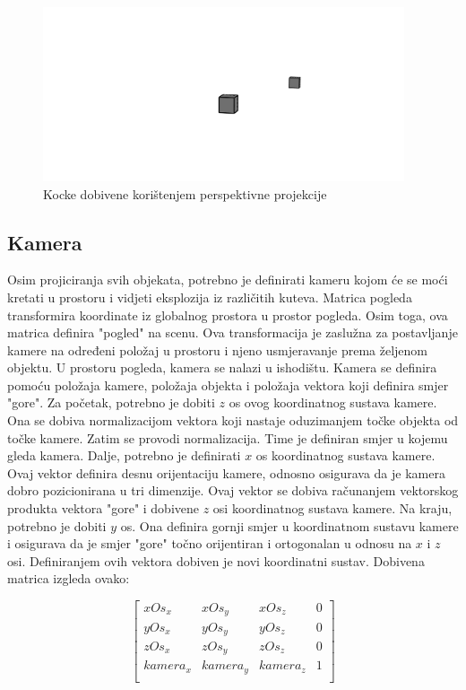 \documentclass{foi}
\begin{document}
\begin{figure}[H]
	\centering
	\includegraphics[width=0.95\textwidth]{slike/37_PerspektivnaProjekcijaKuba.png}
	\captionsetup{justification=centering}
	\caption{Kocke dobivene korištenjem perspektivne projekcije}
	\label{fig:PerspektivnaProjekcijaKuba}
\end{figure}

\subsection{Kamera}
Osim projiciranja svih objekata, potrebno je definirati kameru kojom će se moći kretati u prostoru i vidjeti eksplozija iz različitih kuteva. Matrica pogleda transformira koordinate iz globalnog prostora u prostor pogleda. Osim toga, ova matrica definira "pogled" na scenu. Ova transformacija je zaslužna za postavljanje kamere na određeni položaj u prostoru i njeno usmjeravanje prema željenom objektu. U prostoru pogleda, kamera se nalazi u ishodištu. Kamera se definira pomoću položaja kamere, položaja objekta i položaja vektora koji definira smjer "gore". Za početak, potrebno je dobiti $z$ os ovog koordinatnog sustava kamere. Ona se dobiva normalizacijom vektora koji nastaje oduzimanjem točke objekta od točke kamere. Zatim se provodi normalizacija. Time je definiran smjer u kojemu gleda kamera. Dalje, potrebno je definirati $x$ os koordinatnog sustava kamere. Ovaj vektor definira desnu orijentaciju kamere, odnosno osigurava da je kamera dobro pozicionirana u tri dimenzije. Ovaj vektor se dobiva računanjem vektorskog produkta vektora "gore" i dobivene $z$ osi koordinatnog sustava kamere. Na kraju, potrebno je dobiti $y$ os. Ona definira gornji smjer u koordinatnom sustavu kamere i osigurava da je smjer "gore" točno orijentiran i ortogonalan u odnosu na $x$ i $z$ osi. Definiranjem ovih vektora dobiven je novi koordinatni sustav. Dobivena matrica izgleda ovako:

\[
\begin{bmatrix}
	xOs_x & xOs_y & xOs_z & 0 \\
	yOs_x & yOs_y & yOs_z & 0 \\
	zOs_x & zOs_y & zOs_z & 0 \\
	kamera_x & kamera_y & kamera_z & 1 \\
\end{bmatrix}
\]
\end{document}
